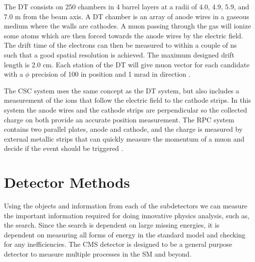 The DT consists on 250 chambers in 4 barrel layers at a radii of 4.0, 4.9, 5.9, and 7.0 m from the beam axis. A DT chamber is an array of anode wires in a gaseous medium where the walls are cathodes. A muon passing through the gas will ionize some atoms which are then forced towards the anode wires by the electric field. The drift time of the electrons can then be measured to within a couple of ns such that a good spatial resolution is achieved. The maximum designed drift length is 2.0 cm. Each station of the DT will give muon vector for each candidate with a $\phi$ precision of 100 \mum{} in position and 1 mrad in direction \cite{collaboration_cms_2007}. 

The CSC system uses the same concept as the DT system, but also includes a measurement of the ions that follow the electric field to the cathode strips. In this system the anode wires and the cathode strips are perpendicular so the collected charge on both provide an accurate position measurement. The RPC system contains two parallel plates, anode and cathode, and the charge is measured by external metallic strips that can quickly measure the momentum of a muon and decide if the event should be triggered \cite{collaboration_cms_2007}.

\section{Detector Methods}
\label{sec:DetMethods}



Using the objects and information from each of the subdetectors we can measure the important information required for doing innovative physics analysis, such as, the \st{} search. Since the search is dependent on large missing energies, it is dependent on measuring all forms of energy in the standard model and checking for any inefficiencies. The CMS detector is designed to be a general purpose detector to measure multiple processes in the SM and beyond. 
